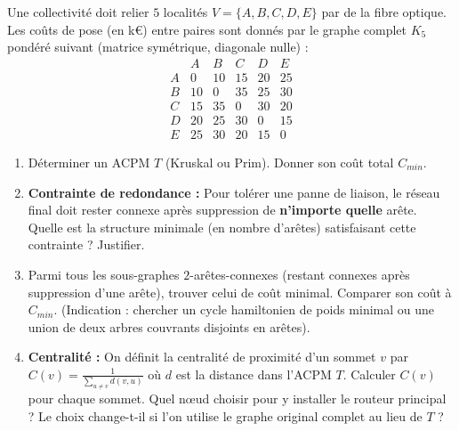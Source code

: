 \documentclass[11pt]{article}
\begin{document}
\begin{exercice}
Une collectivité doit relier $5$ localités $V=\{A,B,C,D,E\}$ par de la fibre optique. Les coûts de pose (en k€) entre paires sont donnés par le graphe complet $K_5$ pondéré suivant (matrice symétrique, diagonale nulle) :
\[
\begin{array}{c|ccccc}
 & A & B & C & D & E \\ \hline
A & 0 & 10 & 15 & 20 & 25 \\
B & 10 & 0 & 35 & 25 & 30 \\
C & 15 & 35 & 0 & 30 & 20 \\
D & 20 & 25 & 30 & 0 & 15 \\
E & 25 & 30 & 20 & 15 & 0
\end{array}
\]
\begin{enumerate}
    \item Déterminer un ACPM $T$ (Kruskal ou Prim). Donner son coût total $C_{min}$.
    \item \textbf{Contrainte de redondance :} Pour tolérer une panne de liaison, le réseau final doit rester connexe après suppression de \textbf{n'importe quelle} arête. Quelle est la structure minimale (en nombre d'arêtes) satisfaisant cette contrainte ? Justifier.
    \item Parmi tous les sous-graphes $2$-arêtes-connexes (restant connexes après suppression d'une arête), trouver celui de coût minimal. Comparer son coût à $C_{min}$. (Indication : chercher un cycle hamiltonien de poids minimal ou une union de deux arbres couvrants disjoints en arêtes).
    \item \textbf{Centralité :} On définit la centralité de proximité d'un sommet $v$ par $C(v) = \frac{1}{\sum_{u \neq v} d(v,u)}$ où $d$ est la distance dans l'ACPM $T$. Calculer $C(v)$ pour chaque sommet. Quel nœud choisir pour y installer le routeur principal ? Le choix change-t-il si l'on utilise le graphe original complet au lieu de $T$ ?
\end{enumerate}
\end{exercice}
\end{document}
